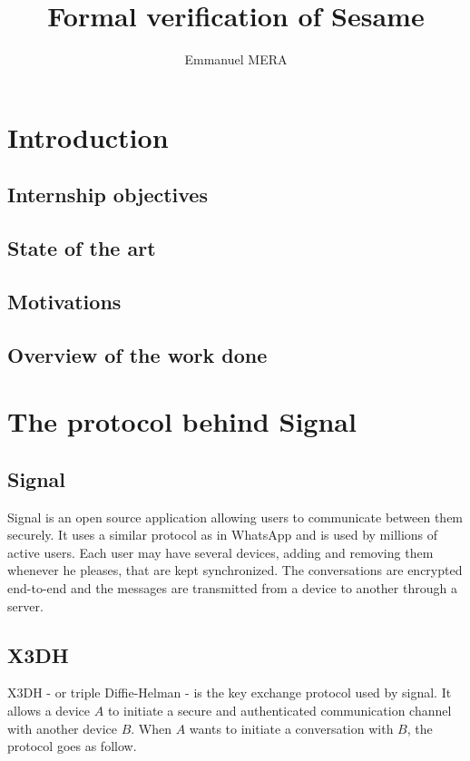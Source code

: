 \documentclass[a4paper, 10pt]{article}
\title{Formal verification of Sesame}
\author{Emmanuel MERA}
\begin{document}
\maketitle

\section{Introduction}
	\subsection{Internship objectives}

	\subsection{State of the art}

	\subsection{Motivations}

	\subsection{Overview of the work done}

\section{The protocol behind Signal}
	\subsection{Signal}
		Signal is an open source application allowing users to communicate between them securely. It uses a similar protocol as in WhatsApp and is used by millions of active users. Each user may have several devices, adding and removing them whenever he pleases, that are kept synchronized. The conversations are encrypted end-to-end and the messages are transmitted from a device to another through a server.

	\subsection{X3DH}
		X3DH - or triple Diffie-Helman - is the key exchange protocol used by signal. It allows a device $A$ to initiate a secure and authenticated communication channel with another device $B$.
		When $A$ wants to initiate a conversation with $B$, the protocol goes as follow.
		
\end{document}
